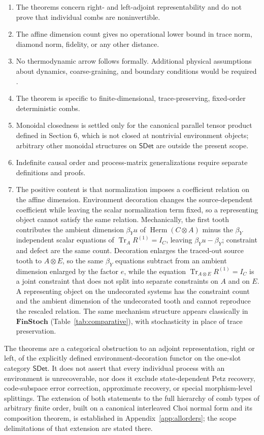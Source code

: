 \documentclass[11pt,a4paper]{article}
\theoremstyle{definition}
\theoremstyle{plain}
\theoremstyle{remark}
\DeclareMathOperator{\Tr}{Tr}
\DeclareMathOperator{\Herm}{Herm}
\newcommand{\SDet}{\mathsf{SDet}}
\begin{document}
\begin{enumerate}
\item The theorems concern right- and left-adjoint representability and do not prove that individual combs are noninvertible.
\item The affine dimension count gives no operational lower bound in trace norm, diamond norm, fidelity, or any other distance.
\item No thermodynamic arrow follows formally. Additional physical assumptions about dynamics, coarse-graining, and boundary conditions would be required \cite{price1996,wallace2023}.
\item The theorem is specific to finite-dimensional, trace-preserving, fixed-order deterministic combs.
\item Monoidal closedness is settled only for the canonical parallel tensor product defined in Section 6, which is not closed at nontrivial environment objects; arbitrary other monoidal structures on $\SDet$ are outside the present scope.
\item Indefinite causal order and process-matrix generalizations require separate definitions and proofs.
\item The positive content is that normalization imposes a coefficient relation on the affine dimension. Environment decoration changes the source-dependent coefficient while leaving the scalar normalization term fixed, so a representing object cannot satisfy the same relation. Mechanically, the first tooth contributes the ambient dimension $\beta_Yu$ of $\Herm(C\otimes A)$ minus the $\beta_Y$ independent scalar equations of $\Tr_A R^{(1)}=I_C$, leaving $\beta_Yu-\beta_Y$; constraint and defect are the same count. Decoration enlarges the traced-out source tooth to $A\otimes E$, so the same $\beta_Y$ equations subtract from an ambient dimension enlarged by the factor $e$, while the equation $\Tr_{A\otimes E}R^{(1)}=I_C$ is a joint constraint that does not split into separate constraints on $A$ and on $E$. A representing object on the undecorated systems has the constraint count and the ambient dimension of the undecorated tooth and cannot reproduce the rescaled relation. The same mechanism structure appears classically in $\mathbf{FinStoch}$ (Table~\ref{tab:comparative}), with stochasticity in place of trace preservation.
\end{enumerate}

The theorems are a categorical obstruction to an adjoint representation, right or left, of the explicitly defined environment-decoration functor on the one-slot category $\SDet$. It does not assert that every individual process with an environment is unrecoverable, nor does it exclude state-dependent Petz recovery, code-subspace error correction, approximate recovery, or special morphism-level splittings. The extension of both statements to the full hierarchy of comb types of arbitrary finite order, built on a canonical interleaved Choi normal form and its composition theorem, is established in Appendix~\ref{app:allorders}; the scope delimitations of that extension are stated there.
\end{document}
